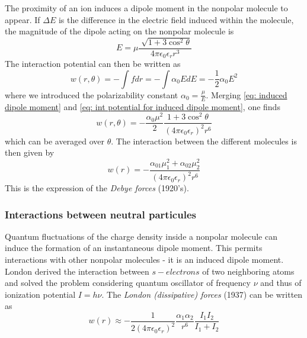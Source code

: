 \documentclass[../phys-f308.tex]{subfiles}
\begin{document}
    The proximity of an ion induces a dipole moment in the nonpolar molecule to appear. If $\Delta E$ is the difference in the electric field induced within the molecule, the magnitude of the dipole acting on the nonpolar molecule is
    \begin{equation}
        E = \mu\frac{\sqrt[]{1+3\cos^2\theta}}{4\pi\epsilon_0\epsilon_r r^3}\label{eq: induced dipole moment}
    \end{equation}
    The interaction potential can then be written as
    \begin{equation}
        w(r,\theta) = -\int fdr = -\int \alpha_0 EdE = -\frac{1}{2}\alpha_0E^2\label{eq: int potential for induced dipole moment}
    \end{equation}
    where we introduced the polarizability constant $\alpha_0 = \frac{\mu}{E}$. Merging \eqref{eq: induced dipole moment} and \eqref{eq: int potential for induced dipole moment}, one finds
    \begin{equation}
        w(r,\theta) = -\frac{\alpha_0\mu^2}{2}\frac{1+3\cos^2\theta}{\left(4\pi\epsilon_0\epsilon_r\right)^2 r^6}
    \end{equation}
    which can be averaged over $\theta$. The interaction between the different molecules is then given by
    \begin{equation}
        w(r) = -\frac{\alpha_{01}\mu_1^2+\alpha_{02}\mu_2^2}{\left(4\pi\epsilon_0\epsilon_r\right)^2r^6}\label{eq: Debye forces}
    \end{equation}
    This is the expression of the \emph{Debye forces} (1920's).

    \subsubsection{Interactions between neutral particules}

    \color{purple}Quantum \color{black}fluctuations of the charge density inside a nonpolar molecule can induce the formation of an instantaneous dipole moment. This permits interactions with other nonpolar molecules - it is an induced dipole moment. London derived the interaction between $s-electrons$ of two neighboring atoms and solved the problem considering quantum oscillator of frequency $\nu$ and thus of ionization potential $I = h\nu$. The \emph{London (dissipative) forces} (1937) can be written as
    \begin{equation}
        w(r) \approx -\frac{1}{2\left(4\pi\epsilon_0\epsilon_r\right)^2}\frac{\alpha_1\alpha_2}{r^6}\frac{I_1I_2}{I_1+I_2}\label{eq: London (dissipative) forces}
    \end{equation}
\end{document}
